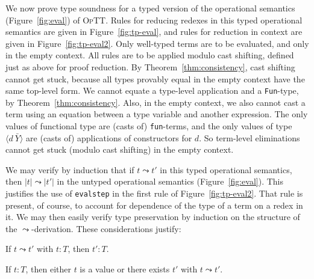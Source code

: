 \documentclass{fundam}
\newcommand{\optt}{\textsc{OpTT}}
\begin{document}
We now prove type soundness for a typed version of the operational
semantics (Figure~\ref{fig:eval}) of \optt.  Rules for reducing
redexes in this typed operational semantics are given in
Figure~\ref{fig:tp-eval}, and rules for reduction in context are given
in Figure~\ref{fig:tp-eval2}.  Only well-typed terms are to be
evaluated, and only in the empty context.  All rules are to be applied
modulo cast shifting, defined just as above for proof reduction.  By
Theorem~\ref{thm:consistency}, cast shifting cannot get stuck, because
all types provably equal in the empty context have the same top-level
form.  We cannot equate a type-level application and a
\texttt{Fun}-type, by Theorem~\ref{thm:consistency}.  Also, in the
empty context, we also cannot cast a term using an equation between a
type variable and another expression.  The only values of functional
type are (casts of) \texttt{fun}-terms, and the only values of type
$\langle d\ \bar{Y}\rangle$ are (casts of) applications of
constructors for $d$.  So term-level eliminations cannot get stuck
(modulo cast shifting) in the empty context.

We may verify by induction that if $t \leadsto t'$ in this typed
operational semantics, then $|t| \leadsto |t'|$ in the untyped
operational semantics (Figure~\ref{fig:eval}).  This justifies the use
of \texttt{evalstep} in the first rule of Figure~\ref{fig:tp-eval2}.
That rule is present, of course, to account for dependence of the type
of a term on a redex in it.  We may then easily verify type
preservation by induction on the structure of the
$\leadsto$-derivation.  These considerations justify:

\begin{theorem}
If $t \leadsto t'$ with $t:T$, then $t':T$.
\end{theorem}

\begin{theorem}[Progress]
If $t:T$, then either $t$ is a value or there exists $t'$ with $t \leadsto t'$.
\end{theorem}
\end{document}
